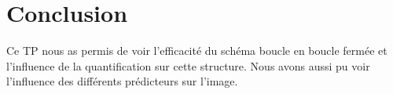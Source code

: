 \documentclass[12pt]{report}
\begin{document}
\section{Conclusion}

Ce TP nous as permis de voir l’efficacité du schéma boucle en boucle fermée et l'influence de la quantification sur cette structure. Nous avons aussi pu voir l'influence des différents prédicteurs sur l'image.

\newpage



\renewcommand*\listfigurename{\large Liste des figures}
\listoffigures
\newpage
\end{document}
